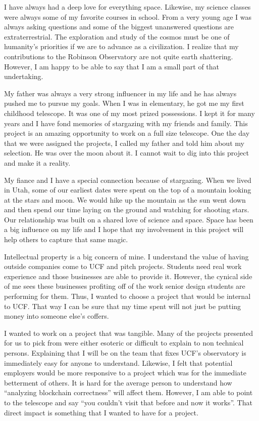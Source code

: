 \documentclass[12pt]{report}
\begin{document}
I have always had a deep love for everything space. Likewise, my science classes were always some of my favorite courses in school. From a very young age I was always asking questions and some of the biggest unanswered questions are extraterrestrial. The exploration and study of the cosmos must be one of humanity’s priorities if we are to advance as a civilization. I realize that my contributions to the Robinson Observatory are not quite earth shattering. However, I am happy to be able to say that I am a small part of that undertaking.

My father was always a very strong influencer in my life and he has always pushed me to pursue my goals. When I was in elementary, he got me my first childhood telescope. It was one of my most prized possessions. I kept it for many years and I have fond memories of stargazing with my friends and family. This project is an amazing opportunity to work on a full size telescope. One the day that we were assigned the projects, I called my father and told him about my selection. He was over the moon about it. I cannot wait to dig into this project and make it a reality.

My fiance and I have a special connection because of stargazing. When we lived in Utah, some of our earliest dates were spent on the top of a mountain looking at the stars and moon. We would hike up the mountain as the sun went down and then spend our time laying on the ground and watching for shooting stars. Our relationship was built on a shared love of science and space. Space has been a big influence on my life and I hope that my involvement in this project will help others to capture that same magic.

Intellectual property is a big concern of mine. I understand the value of having outside companies come to UCF and pitch projects. Students need real work experience and those businesses are able to provide it. However, the cynical side of me sees these businesses profiting off of the work senior design students are performing for them. Thus, I wanted to choose a project that would be internal to UCF. That way I can be sure that my time spent will not just be putting money into someone else’s coffers.

I wanted to work on a project that was tangible. Many of the projects presented for us to pick from were either esoteric or difficult to explain to non technical persons. Explaining that I will be on the team that fixes UCF’s observatory is immediately easy for anyone to understand. Likewise, I felt that potential employers would be more responsive to a project which was for the immediate betterment of others. It is hard for the average person to understand how “analyzing blockchain correctness” will affect them. However, I am able to point to the telescope and say “you couldn’t visit that before and now it works”. That direct impact is something that I wanted to have for a project.
\end{document}
